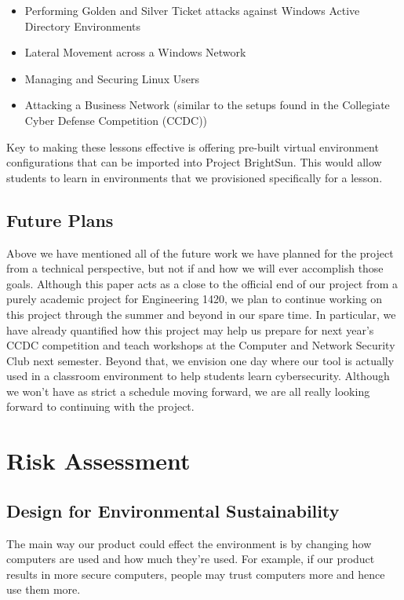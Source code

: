 \documentclass[openright]{report}
\begin{document}
\begin{itemize}
    \item Performing Golden and Silver Ticket attacks against Windows Active Directory Environments
    \item Lateral Movement across a Windows Network
    \item Managing and Securing Linux Users
    \item Attacking a Business Network (similar to the setups found in the Collegiate Cyber Defense Competition (CCDC)) 
\end{itemize}

Key to making these lessons effective is offering pre-built virtual environment configurations that can be imported into Project BrightSun. This would allow students to learn in environments that we provisioned specifically for a lesson.

\section{Future Plans}

Above we have mentioned all of the future work we have planned for the project from a technical perspective, but not if and how we will ever accomplish those goals. Although this paper acts as a close to the official end of our project from a purely academic project for Engineering 1420, we plan to continue working on this project through the summer and beyond in our spare time. In particular, we have already quantified how this project may help us prepare for next year's CCDC competition and teach workshops at the Computer and Network Security Club next semester. Beyond that, we envision one day where our tool is actually used in a classroom environment to help students learn cybersecurity. Although we won't have as strict a schedule moving forward, we are all really looking forward to continuing with the project.

\chapter{Risk Assessment}

\section{Design for Environmental Sustainability}

\par The main way our product could effect the environment is by changing how computers are used and how much they're used. For example, if our product results in more secure computers, people may trust computers more and hence use them more. 
\end{document}
